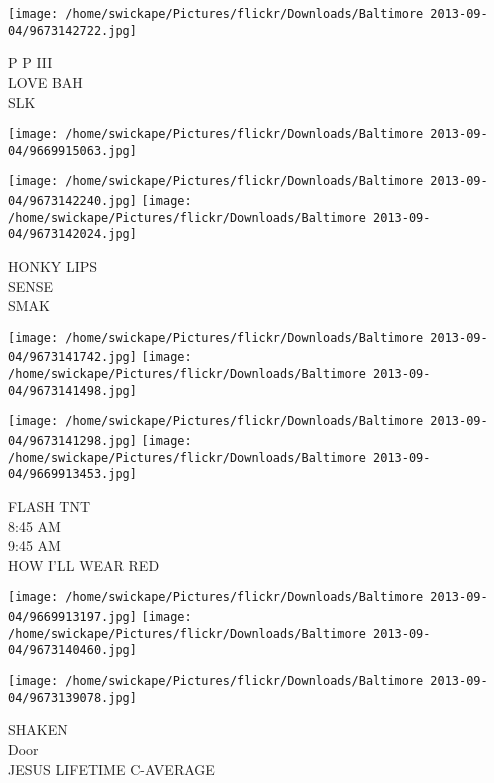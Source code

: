 \documentclass[10pt,letterpaper]{article}
\begin{document}
\texttt{[image: /home/swickape/Pictures/flickr/Downloads/Baltimore 2013-09-04/9673142722.jpg]}

P P III\\
LOVE BAH\\
SLK\\
\pagebreak

\texttt{[image: /home/swickape/Pictures/flickr/Downloads/Baltimore 2013-09-04/9669915063.jpg]}

\vspace{0.25in}
\texttt{[image: /home/swickape/Pictures/flickr/Downloads/Baltimore 2013-09-04/9673142240.jpg]}
\texttt{[image: /home/swickape/Pictures/flickr/Downloads/Baltimore 2013-09-04/9673142024.jpg]}

HONKY LIPS\\
SENSE\\
SMAK\\
\pagebreak

\texttt{[image: /home/swickape/Pictures/flickr/Downloads/Baltimore 2013-09-04/9673141742.jpg]}
\texttt{[image: /home/swickape/Pictures/flickr/Downloads/Baltimore 2013-09-04/9673141498.jpg]}

\texttt{[image: /home/swickape/Pictures/flickr/Downloads/Baltimore 2013-09-04/9673141298.jpg]}
\texttt{[image: /home/swickape/Pictures/flickr/Downloads/Baltimore 2013-09-04/9669913453.jpg]}

FLASH TNT\\
8:45 AM\\
9:45 AM\\
HOW I'LL WEAR RED\\
\pagebreak

\texttt{[image: /home/swickape/Pictures/flickr/Downloads/Baltimore 2013-09-04/9669913197.jpg]}
\texttt{[image: /home/swickape/Pictures/flickr/Downloads/Baltimore 2013-09-04/9673140460.jpg]}

\texttt{[image: /home/swickape/Pictures/flickr/Downloads/Baltimore 2013-09-04/9673139078.jpg]}

SHAKEN\\
Door\\
JESUS LIFETIME C{-}AVERAGE\\
\pagebreak
\end{document}
